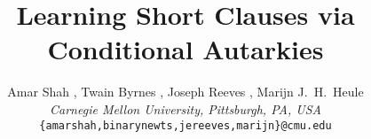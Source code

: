   
  \usepackage[capitalise]{cleveref}
  \usepackage{tabularx}
  \usepackage{enumitem}
  
%   
  

  \newtheorem{definition}{Definition}
  \newtheorem{theorem}{Theorem}
  \newtheorem{lemma}{Lemma}
  \newtheorem{claim}{Claim}


  
  \newcommand{\unsat}{\texttt{unsat}\xspace}
  \newcommand{\sat}{\texttt{sat}\xspace}
  \newcommand{\tool}{CA\textsc{uti}C\textsc{aL}\xspace}
  \newcommand{\toolminus}{$\text{CA}\textsc{uti}\text{C}\textsc{aL}^{-}$\xspace}
  \newcommand{\pr}{\textsf{PR}\xspace}
  \newcommand{\er}{\texttt{ER}\xspace}
  \newcommand{\impunit}{\vdash_1}
  \newcommand{\impunitclause}[3]{#1 \land \overline{#2} \impunit #3}
    \newcommand{\impunitclauseNoNeg}[3]{#1 \land #2 \impunit #3}
  \newcommand{\lingeling}{\textsc{lingeling}\xspace}
  \newcommand{\cadical}{C\textsc{a}D\textsc{i}C\textsc{aL}\xspace}
  \newcommand{\sadical}{S\textsc{a}D\textsc{i}C\textsc{aL}\xspace}
  \newcommand{\glucoser}{G\textsc{lucos}ER\xspace}
  \newcommand{\prelearn}{PR\textsc{e}L\textsc{earn}\xspace}
  \newcommand{\ph}[1]{\ensuremath{\mathrm{PHP}(#1)}}
  
    \newcommand{\kissat}{\textsc{Kissat}\xspace}
    \newcommand{\cryptoMiniSAT}{\textsc{CryptoMiniSAT}\xspace}


  
  
  
  \title{Learning Short Clauses via Conditional Autarkies}
  
  \author{Amar Shah , Twain Byrnes , Joseph Reeves , Marijn J.\ H.\ Heule  \\
  \emph{Carnegie Mellon University, Pittsburgh, PA, USA} \\
  \texttt{\small \{amarshah,binarynewts,jereeves,marijn\}@cmu.edu}}
  
  \maketitle
  
